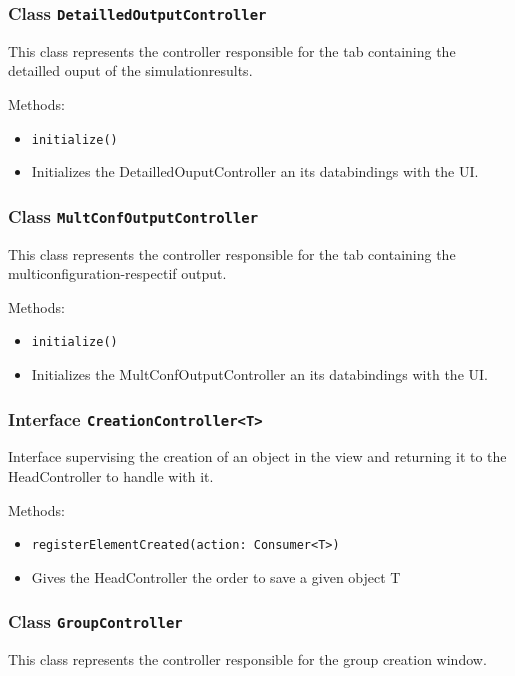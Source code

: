 \documentclass[parskip=full,11pt]{scrartcl}
\begin{document}
\subsubsection{Class \texttt{DetailledOutputController}}
This class represents the controller responsible for the tab containing the detailled ouput of the simulationresults.

Methods:
\begin{itemize}\itemsep -10pt
\item \texttt{initialize()}
\item[] Initializes the DetailledOuputController an its databindings with the UI.
\end{itemize}



\subsubsection{Class \texttt{MultConfOutputController}}
This class represents the controller responsible for the tab containing the multiconfiguration-respectif output.

Methods:
\begin{itemize}\itemsep -10pt
\item \texttt{initialize()}
\item[] Initializes the MultConfOutputController an its databindings with the UI.
\end{itemize}

\subsubsection{Interface \texttt{CreationController<T>}}
Interface supervising the creation of an object in the view and returning it to the HeadController to handle with it.

Methods:
\begin{itemize}\itemsep -10pt
\item \texttt{registerElementCreated(action: Consumer<T>)}
\item[] Gives the HeadController the order to save a given object T
\end{itemize}

\subsubsection{Class \texttt{GroupController}}
This class represents the controller responsible for the group creation window.
\end{document}
